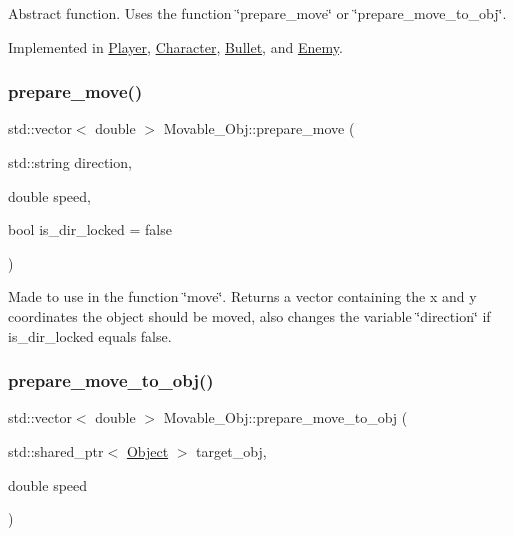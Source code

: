 Abstract function. Uses the function \char`\"{}prepare\+\_\+move\char`\"{} or \char`\"{}prepare\+\_\+move\+\_\+to\+\_\+obj\char`\"{}. 

Implemented in \hyperlink{classPlayer_ace418f6e52cafc354f57268cfe4b646a}{Player}, \hyperlink{classCharacter_a91211cae08aab6a74b43377e4463283a}{Character}, \hyperlink{classBullet_a00c0fec9c45ab1ab2b5883404d1bda62}{Bullet}, and \hyperlink{classEnemy_a8e842aa8ab6c75f2c9d71c6c3f43d88c}{Enemy}.

\mbox{\label{classMovable__Obj_a33677e18516f55621b2e4b4a8f2d74f6}} 
\subsubsection{\texorpdfstring{prepare\+\_\+move()}{prepare\_move()}}
{\footnotesize\ttfamily std\+::vector$<$ double $>$ Movable\+\_\+\+Obj\+::prepare\+\_\+move (\begin{DoxyParamCaption}\item[{std\+::string}]{direction,  }\item[{double}]{speed,  }\item[{bool}]{is\+\_\+dir\+\_\+locked = {\ttfamily false} }\end{DoxyParamCaption})\hspace{0.3cm}{\ttfamily [protected]}}

Made to use in the function \char`\"{}move\char`\"{}. Returns a vector containing the x and y coordinates the object should be moved, also changes the variable \char`\"{}direction\char`\"{} if is\+\_\+dir\+\_\+locked equals false. \mbox{\label{classMovable__Obj_aaf4c69106180fae90e0bc689707f334c}} 
\subsubsection{\texorpdfstring{prepare\+\_\+move\+\_\+to\+\_\+obj()}{prepare\_move\_to\_obj()}}
{\footnotesize\ttfamily std\+::vector$<$ double $>$ Movable\+\_\+\+Obj\+::prepare\+\_\+move\+\_\+to\+\_\+obj (\begin{DoxyParamCaption}\item[{std\+::shared\+\_\+ptr$<$ \hyperlink{classObject}{Object} $>$}]{target\+\_\+obj,  }\item[{double}]{speed }\end{DoxyParamCaption})\hspace{0.3cm}{\ttfamily [protected]}}

